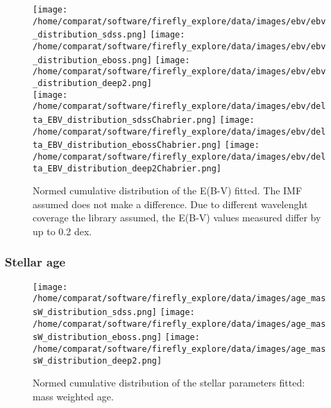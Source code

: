 \documentclass[onecolumn]{aa}
\begin{document}
\begin{figure}
\begin{center}
\caption{\label{fig:distributions:EBV} 
Normed cumulative distribution of the E(B-V) fitted. The IMF assumed does not make a difference. Due to different wavelenght coverage the library assumed, the E(B-V) values measured differ by up to 0.2 dex.}  
\texttt{[image: /home/comparat/software/firefly\_explore/data/images/ebv/ebv\_distribution\_sdss.png]}
\texttt{[image: /home/comparat/software/firefly\_explore/data/images/ebv/ebv\_distribution\_eboss.png]}          
\texttt{[image: /home/comparat/software/firefly\_explore/data/images/ebv/ebv\_distribution\_deep2.png]} \\
\texttt{[image: /home/comparat/software/firefly\_explore/data/images/ebv/delta\_EBV\_distribution\_sdssChabrier.png]}
\texttt{[image: /home/comparat/software/firefly\_explore/data/images/ebv/delta\_EBV\_distribution\_ebossChabrier.png]}
\texttt{[image: /home/comparat/software/firefly\_explore/data/images/ebv/delta\_EBV\_distribution\_deep2Chabrier.png]}
\end{center}
\end{figure}

\subsubsection{Stellar age}

\begin{figure}
\begin{center}
\caption{\label{fig:distributions:MwA} 
Normed cumulative distribution of the stellar parameters fitted: mass weighted age.}  
\texttt{[image: /home/comparat/software/firefly\_explore/data/images/age\_massW\_distribution\_sdss.png]}
\texttt{[image: /home/comparat/software/firefly\_explore/data/images/age\_massW\_distribution\_eboss.png]}
\texttt{[image: /home/comparat/software/firefly\_explore/data/images/age\_massW\_distribution\_deep2.png]}
\end{center}
\end{figure}
\end{document}

